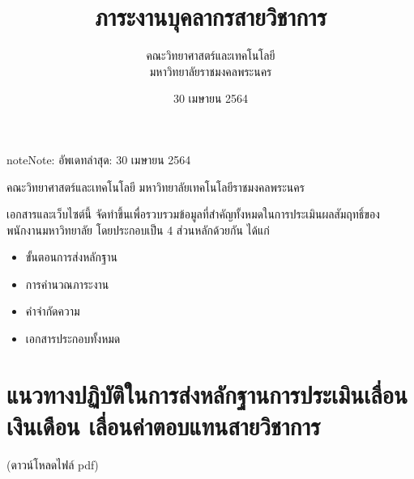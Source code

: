 \documentclass[a4paper,12pt,english]{sphinxmanual}
\title{ภาระงานบุคลากรสายวิชาการ}
\date{30 เมษายน 2564}
\author{คณะวิทยาศาสตร์และเทคโนโลยี \\ มหาวิทยาลัยราชมงคลพระนคร}
\begin{document}
\pagestyle{empty}
\sphinxmaketitle
\pagestyle{plain}
\sphinxtableofcontents
\pagestyle{normal}
\label{\detokenize{index::doc}}
\begin{sphinxadmonition}{note}{Note:}
อัพเดทล่าสุด: 30 เมษายน 2564
\end{sphinxadmonition}



คณะวิทยาศาสตร์และเทคโนโลยี มหาวิทยาลัยเทคโนโลยีราชมงคลพระนคร

เอกสารและเว็บไซต์นี้ จัดทำขึ้นเพื่อรวบรวมข้อมูลที่สำคัญทั้งหมดในการประเมินผลสัมฤทธิ์ของพนักงานมหาวิทยาลัย โดยประกอบเป็น 4 ส่วนหลักด้วยกัน ได้แก่
\begin{itemize}
\item {} 
ขั้นตอนการส่งหลักฐาน

\item {} 
การคำนวณภาระงาน

\item {} 
คำจำกัดความ

\item {} 
เอกสารประกอบทั้งหมด

\end{itemize}


\chapter{แนวทางปฏิบัติในการส่งหลักฐานการประเมินเลื่อนเงินเดือน เลื่อนค่าตอบแทนสายวิชาการ}
\label{\detokenize{howtosubmit:id1}}\label{\detokenize{howtosubmit::doc}}
 (ดาวน์โหลดไฟล์ pdf)

\noindent{}

\noindent{}

\noindent{}

\noindent{}

\noindent{}

\noindent{}

\noindent{}
\end{document}

